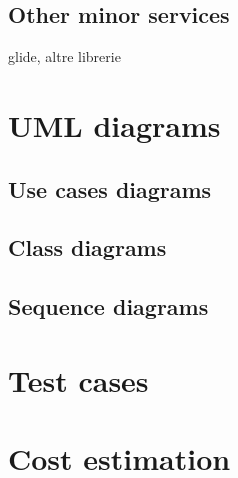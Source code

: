 \documentclass[a4paper]{scrreprt}
\begin{document}
\section{Other minor services}
glide, altre librerie


\chapter{UML diagrams}

\section{Use cases diagrams}

\section{Class diagrams}

\section{Sequence diagrams}


\chapter{Test cases}


\chapter{Cost estimation}



%
%
\end{document}
